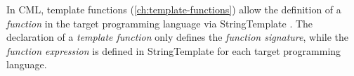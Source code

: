 In CML, template functions (\ref{ch:template-functions})
allow the definition of a \emph{function} in the target programming language
via StringTemplate \cite{st}.
The declaration of a \emph{template function} only defines
the \emph{function signature},
while the \emph{function expression} is defined in StringTemplate
for each target programming language.
